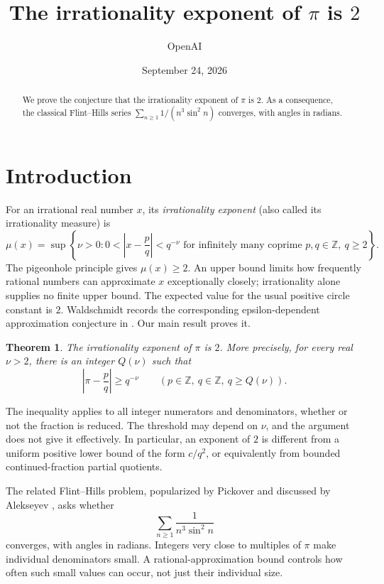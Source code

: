 \documentclass[11pt]{article}
\title{The irrationality exponent of \(\pi\) is \(2\)}
\author{OpenAI}
\date{September 24, 2026}
\newcommand{\ZZ}{\mathbb Z}
\newtheorem{theorem}{Theorem}[section]
\theoremstyle{definition}
\theoremstyle{remark}
\numberwithin{equation}{section}
\begin{document}
\maketitle

\begin{abstract}
We prove the conjecture that the irrationality exponent of \(\pi\) is \(2\).
As a consequence, the classical Flint--Hills series
\(\sum_{n\ge1}1/(n^3\sin^2 n)\) converges, with angles in radians.
\end{abstract}

\section{Introduction}\label{sec:introduction}

For an irrational real number \(x\), its \emph{irrationality exponent}
(also called its irrationality measure) is
\[
\mu(x)=\sup\left\{\nu>0:
0<\left|x-\frac pq\right|<q^{-\nu}
\text{ for infinitely many coprime }p,q\in\ZZ,\ q\ge2\right\}.
\]
The pigeonhole principle gives \(\mu(x)\ge2\). An upper bound limits
how frequently rational numbers can approximate \(x\) exceptionally
closely; irrationality alone supplies no finite upper bound. The expected
value for the usual positive circle constant is \(2\). Waldschmidt
records the corresponding epsilon-dependent approximation conjecture
in \cite[p.~265]{waldschmidt}. Our main result proves it.

\begin{theorem}\label{thm:main}
The irrationality exponent of \(\pi\) is \(2\). More precisely, for every
real \(\nu>2\), there is an integer \(Q(\nu)\) such that
\[
\left|\pi-\frac pq\right|\ge q^{-\nu}
\qquad(p\in\ZZ,\ q\in\ZZ,\ q\ge Q(\nu)).
\]
\end{theorem}

The inequality applies to all integer numerators and denominators,
whether or not the fraction is reduced. The threshold may depend on
\(\nu\), and the argument does not give it effectively. In particular,
an exponent of \(2\) is different from a uniform positive lower bound
of the form \(c/q^2\), or equivalently from bounded continued-fraction
partial quotients.

The related Flint--Hills problem, popularized by Pickover and discussed
by Alekseyev \cite{alekseyev}, asks whether
\[
\sum_{n\ge1}\frac{1}{n^3\sin^2 n}
\]
converges, with angles in radians. Integers very close to multiples of
\(\pi\) make individual denominators small. A rational-approximation
bound controls how often such small values can occur, not just their
individual size.
\end{document}
